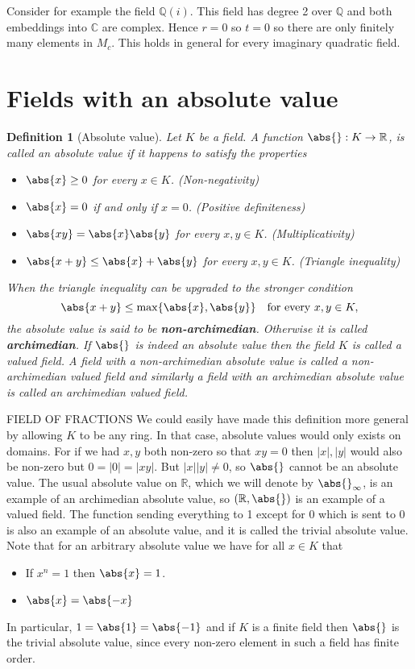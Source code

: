 \documentclass{article}
\newtheorem{definition}{Definition}[section]
\newcommand{\mbb}[1]{\mathbb{#1}}
\begin{document}
Consider for example the field $\mbb Q(i)$. This field has degree 2 over $\mbb Q$ and both embeddings into $\mbb C$ are complex. Hence $r = 0$ so $t = 0$ so there are only finitely many elements in $M_c$. This holds in general for every imaginary quadratic field.

\section{Fields with an absolute value}

\begin{definition}[Absolute value]
    Let $K$ be a field. A function $\abs{} : K \to \mbb R$, is called an absolute value if it happens to satisfy the properties
    \begin{itemize}
        \item $\abs{x} \geq 0$ for every $x \in K$. (Non-negativity)
        \item $\abs{x} = 0$ if and only if $x = 0$. (Positive definiteness)
        \item $\abs{xy} = \abs{x} \abs{y}$ for every $x,y \in K$. (Multiplicativity)
        \item $\abs{x + y} \leq \abs{x} + \abs{y}$ for every $x,y \in K$. (Triangle inequality)
    \end{itemize}
    When the triangle inequality can be upgraded to the stronger condition $$\abs{x + y} \leq \max \{\abs{x}, \abs{y}\} \quad \text{for every } x,y \in K,$$
    the absolute value is said to be \textbf{non-archimedian}. Otherwise it is called \textbf{archimedian}. If $\abs{}$ is indeed an absolute value then the field $K$ is called a valued field. A field with a non-archimedian absolute value is called a non-archimedian valued field and similarly a field with an archimedian absolute value is called an archimedian valued field.
\end{definition}

FIELD OF FRACTIONS
We could easily have made this definition more general by allowing $K$ to be any ring. In that case, absolute values would only exists on domains. For if we had $x,y$ both non-zero so that $xy = 0$ then $|x|, |y|$ would also be non-zero but $0 = |0| = |xy|$. But $|x||y| \neq 0$, so $\abs{}$ cannot be an absolute value. The usual absolute value on $\mbb R$, which we will denote by $\abs{}_\infty$,  is an example of an archimedian absolute value, so $(\mbb R, \abs{})$ is an example of a valued field. The function sending everything to 1 except for 0 which is sent to 0 is also an example of an absolute value, and it is called the trivial absolute value. Note that for an arbitrary absolute value we have for all $x \in K$ that
\begin{itemize}
    \item If $x^n = 1$ then $\abs{x} = 1$.
    \item $\abs{x} = \abs{-x}$
\end{itemize}
In particular, $1 = \abs{1} = \abs{-1}$ and if $K$ is a finite field then $\abs{}$ is the trivial absolute value, since every non-zero element in such a field has finite order.
\end{document}
